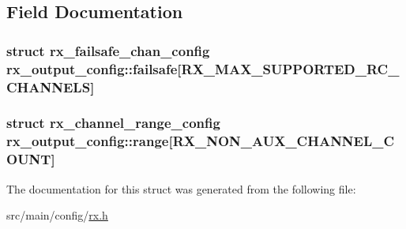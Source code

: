\subsection{Field Documentation}
\hypertarget{structrx__output__config_aa75fb97b6c4122b48064059f2dbca384}{
\subsubsection[{failsafe}]{\setlength{\rightskip}{0pt plus 5cm}struct {\bf rx\+\_\+failsafe\+\_\+chan\+\_\+config} rx\+\_\+output\+\_\+config\+::failsafe\mbox{[}{\bf R\+X\+\_\+\+M\+A\+X\+\_\+\+S\+U\+P\+P\+O\+R\+T\+E\+D\+\_\+\+R\+C\+\_\+\+C\+H\+A\+N\+N\+E\+L\+S}\mbox{]}}}\label{structrx__output__config_aa75fb97b6c4122b48064059f2dbca384}
\hypertarget{structrx__output__config_ae687eede08b00f0d231b8f20a70a5383}{
\subsubsection[{range}]{\setlength{\rightskip}{0pt plus 5cm}struct {\bf rx\+\_\+channel\+\_\+range\+\_\+config} rx\+\_\+output\+\_\+config\+::range\mbox{[}{\bf R\+X\+\_\+\+N\+O\+N\+\_\+\+A\+U\+X\+\_\+\+C\+H\+A\+N\+N\+E\+L\+\_\+\+C\+O\+U\+N\+T}\mbox{]}}}\label{structrx__output__config_ae687eede08b00f0d231b8f20a70a5383}


The documentation for this struct was generated from the following file\+:\begin{DoxyCompactItemize}
\item 
src/main/config/\hyperlink{config_2rx_8h}{rx.\+h}\end{DoxyCompactItemize}
